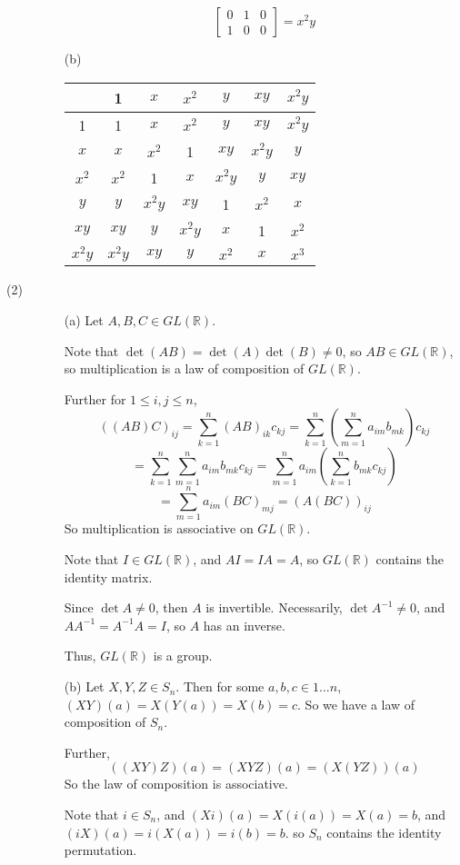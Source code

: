 \documentclass[openany]{book}
\begin{document}
\begin{description}
\begin{itemize}
$$\begin{bmatrix}
0 & 1 & 0 \\
1 & 0 & 0
\end{bmatrix} = x^2y$$
\item[(b)]
\begin{tabular}{| c || c | c | c | c | c | c |}
\hline
& 1 & $x$ & $x^2$ & $y$ & $xy$ & $x^2y$ \\
\hline \hline
1 & 1 & $x$ & $x^2$ & $y$ & $xy$ & $x^2y$ \\
\hline
$x$ & $x$ & $x^2$ & 1 & $xy$ & $x^2y$ & $y$ \\
\hline
$x^2$ & $x^2$ & 1 & $x$ & $x^2y$ & $y$ & $xy$ \\
\hline
$y$ & $y$ & $x^2y$ & $xy$ & 1 & $x^2$ & $x$ \\
\hline
$xy$ & $xy$ & $y$ & $x^2y$ & $x$ & 1 & $x^2$ \\
\hline
$x^2y$ & $x^2y$ & $xy$ & $y$ & $x^2$ & $x$ & $x^3$ \\
\hline
\end{tabular}
\end{itemize}
\item[(2)]
\begin{itemize}
\item[(a)]
Let $A, B, C \in GL(\mathbb{R})$. 

Note that $\det(AB) = \det(A)\det(B) \neq 0$, so $AB \in GL(\mathbb{R})$, so multiplication is a law of composition of $GL(\mathbb{R})$.

Further for $1 \leq i,j \leq n$,
$$((AB)C)_{ij} = \sum_{k=1}^n (AB)_{ik}c_{kj} = \sum_{k=1}^n\left(\sum_{m=1}^n a_{im}b_{mk}\right)c_{kj} $$
$$= \sum_{k=1}^n\sum_{m=1}^n a_{im}b_{mk}c_{kj} = \sum_{m=1}^na_{im}\left(\sum_{k=1}^n b_{mk}c_{kj}\right)$$
$$= \sum_{m=1}^na_{im}(BC)_{mj} = (A(BC))_{ij}$$
So multiplication is associative on $GL(\mathbb{R})$.

Note that $I \in GL(\mathbb{R})$, and $AI = IA = A$, so $GL(\mathbb{R})$ contains the identity matrix.

Since $\det A \neq 0$, then $A$ is invertible. Necessarily, $\det A^{-1} \neq 0$, and $AA^{-1} = A^{-1}A = I$, so $A$ has an inverse. 

Thus, $GL(\mathbb{R})$ is a group.
\item[(b)]
Let $X, Y, Z \in S_n$. Then for some $a, b, c \in 1...n$, $(XY)(a) = X(Y(a)) = X(b) = c$. So we have a law of composition of $S_n$.

Further,
$$((XY)Z)(a) = (XYZ)(a) = (X(YZ))(a)$$
So the law of composition is associative.

Note that $i \in S_n$, and $(Xi)(a) = X(i(a)) = X(a) = b$, and $(iX)(a) = i(X(a)) = i(b) = b$. so $S_n$ contains the identity permutation.


\end{itemize}
\end{description}
\end{document}
